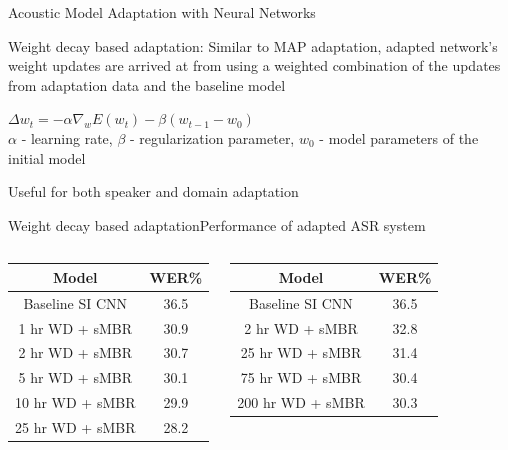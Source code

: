 \begin{frame} {Acoustic Model Adaptation with Neural Networks}

\alert{Weight decay based adaptation}: Similar to MAP adaptation, adapted network's weight updates are arrived at from using a  weighted combination of the updates from adaptation data and the baseline model~\cite{liao2013speaker}
        \begin{center}
        $\Delta w_t = -\alpha{\nabla}_wE(w_t) - \beta(w_{t-1} - w_0)$ \\
        \vspace{1mm}
        \tiny{$\alpha$ - learning rate, $\beta$ - regularization parameter, $w_0$ - model parameters of the initial model}
        \end{center}
Useful for both \alert{speaker and domain adaptation}
\end{frame}

\begin{frame}{Weight decay based adaptation}{Performance of adapted ASR system}
\begin{columns}[T]
\column{2in}
\centering
{\color{orange}{Supervised Adaptation}}
\begin{center}
    \begin{tabular}{@{}cc@{}} \toprule
      {\bf Model} & {\bf WER\%} \\ \midrule
      Baseline SI CNN & 36.5 \\
      1 hr WD + sMBR & 30.9 \\
      2 hr WD + sMBR & 30.7  \\
      5 hr WD + sMBR & 30.1  \\
      10 hr WD + sMBR & 29.9  \\
      25 hr WD + sMBR & 28.2 \\ \bottomrule
    \end{tabular}
  \end{center}
\column{2in}
\centering
{\color{ForestGreen}{Unsupervised Adaptation}}
\begin{center}
    \begin{tabular}{@{}cc@{}} \toprule
      {\bf Model} & {\bf WER\%} \\ \midrule
      Baseline SI CNN & 36.5 \\
      2 hr WD + sMBR & 32.8 \\
      25 hr WD + sMBR & 31.4  \\
      75 hr WD + sMBR & 30.4  \\
      200 hr WD + sMBR & 30.3 \\ \bottomrule
    \end{tabular}
  \end{center}
\end{columns}
\end{frame}

